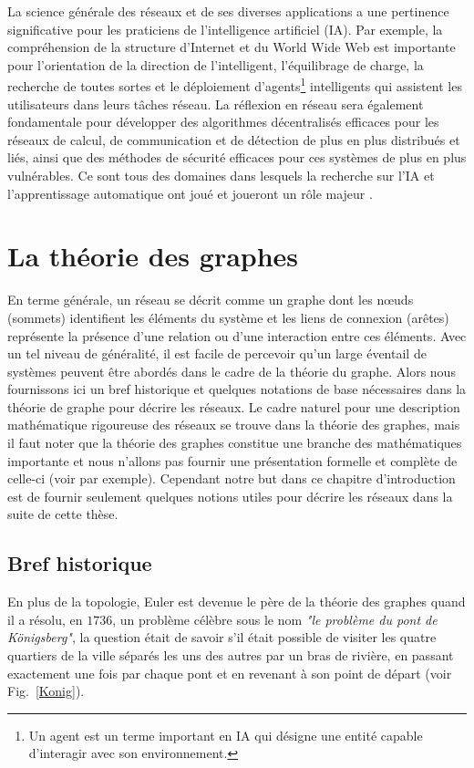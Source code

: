 La science générale des réseaux et de ses diverses applications a une pertinence significative pour les praticiens de 
l'intelligence artificiel (IA). Par exemple, la compréhension de la structure d'Internet et du World Wide Web est importante 
pour l'orientation de la direction de l'intelligent, l'équilibrage de charge, la recherche de toutes sortes et le 
déploiement d'agents\footnote{Un agent est un terme important en IA qui désigne une entité capable d’interagir avec
son environnement.} intelligents qui assistent les utilisateurs dans leurs tâches réseau. La réflexion en
réseau sera également fondamentale pour développer des algorithmes décentralisés efficaces pour les réseaux de calcul,
de communication et de détection de plus en plus distribués et liés, ainsi que des méthodes de sécurité efficaces pour 
ces systèmes de plus en plus vulnérables. Ce sont tous des domaines dans lesquels la recherche sur l'IA et 
l'apprentissage automatique ont joué et joueront un rôle majeur \cite{Mitchell2006,Basheer-Hajmeerb2000,Passerini-al2017}.

\section{La théorie des graphes}
En terme générale, un réseau se décrit comme un graphe dont les nœuds (sommets) identifient les éléments du
système et les liens de connexion (arêtes) représente la présence d'une relation ou d'une interaction entre ces
éléments. Avec un tel niveau de généralité, il est facile de percevoir qu'un large éventail de systèmes peuvent 
être abordés dans le cadre de la théorie du graphe. Alors nous fournissons ici un bref historique et quelques 
notations de base nécessaires dans la théorie de graphe pour décrire les réseaux. Le cadre naturel pour une description
mathématique rigoureuse des réseaux se trouve dans la théorie des graphes, mais il faut noter que la théorie des graphes 
constitue une branche des mathématiques importante et nous n'allons pas fournir une présentation
formelle et complète de  celle-ci (voir \cite{Ha1995,West1996} par exemple). Cependant notre but dans ce chapitre 
d'introduction est de fournir seulement quelques notions utiles pour décrire les réseaux dans la suite de cette thèse.
  \subsection{Bref historique}
  En plus de la topologie, Euler est devenue le père de la théorie des graphes quand il a résolu, en $1736$, un problème 
  célèbre sous le nom \textit{"le problème du pont de K\"{o}nigsberg"}, la question était de savoir s'il était possible 
  de visiter les quatre quartiers de la ville séparés les uns des autres par un bras de rivière, en passant exactement
  une fois par chaque pont et en revenant à son point de départ (voir Fig.~\ref{Konig}).
  
